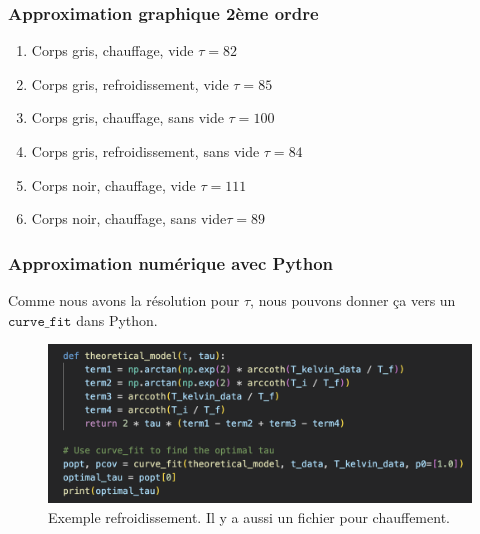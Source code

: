 \documentclass{beamer}
\begin{document}
\begin{frame}
\frametitle{Approximation graphique 2ème ordre}
\begin{enumerate}
	\item{{\color{gray7}Corps gris}{\color{gray4}, {\color{red}chauffage}, vide} \hfill $\tau = 82$\hspace{4em} \newline}
	\item{{\color{gray7}Corps gris}{\color{gray4}, {\color{blue5}refroidissement}, vide} \hfill $\tau = 85$\hspace{4em} \newline}
	\item{{\color{gray7}Corps gris}{\color{gray4}, {\color{red}chauffage}, sans vide} \hfill $\tau = 100$\hspace{4em} \newline}
	\item{{\color{gray7}Corps gris}{\color{gray4}, {\color{blue5}refroidissement}, sans vide} \hfill $\tau = 84$\hspace{4em} \newline}
	\item{{\color{black}Corps noir}{\color{gray4}, {\color{red}chauffage}, vide} \hfill $\tau = 111$\hspace{4em} \newline}
	\item{{\color{black}Corps noir}{\color{gray4}, {\color{red}chauffage}, sans vide}\hfill $\tau = 89$\hspace{4em} \newline}
\end{enumerate}

\end{frame}





\begin{frame}
\frametitle{Approximation numérique avec Python}
Comme nous avons la résolution pour $\tau$, nous pouvons donner ça vers un $\texttt{curve\_fit}$ dans Python.

\begin{figure}
\includegraphics[width=\textwidth]{Fig/Python_Refroid.png}
\caption{Exemple refroidissement. Il y a aussi un fichier pour chauffement.}
\end{figure}

\end{frame}
\end{document}
